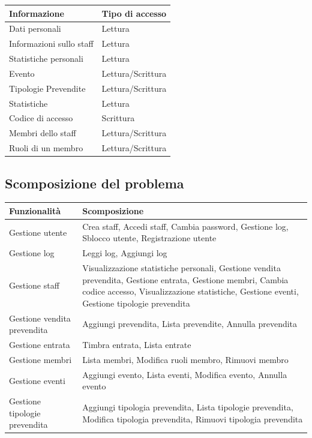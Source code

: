 \documentclass[a4paper]{article}
\begin{document}
\begin{center}
    \begin{tabularx}{1\textwidth}{|X|X|}
    \hline
    \textbf{Informazione} & \textbf{Tipo di accesso} \\
    \hline
    \hline
    Dati personali & Lettura\\
    \hline
    Informazioni sullo staff & Lettura\\
    \hline
    Statistiche personali & Lettura\\
    \hline
    Evento & Lettura/Scrittura\\
    \hline
    Tipologie Prevendite & Lettura/Scrittura\\
    \hline
    Statistiche & Lettura\\
    \hline
    Codice di accesso & Scrittura\\
    \hline
    Membri dello staff & Lettura/Scrittura\\
    \hline
    Ruoli di un membro & Lettura/Scrittura\\
    \hline
    \end{tabularx}
\end{center}

\newpage

\subsection{Scomposizione del problema}

\begin{center}
    \begin{tabularx}{1\textwidth}{|X|X|}
    \hline
    \textbf{Funzionalità} & \textbf{Scomposizione} \\
    \hline
    \hline
    Gestione utente & Crea staff, Accedi staff, Cambia password, Gestione log, Sblocco utente, Registrazione utente\\
    \hline
    Gestione log & Leggi log, Aggiungi log\\
    \hline
    Gestione staff & Visualizzazione statistiche personali, Gestione vendita prevendita, Gestione entrata, Gestione membri, Cambia codice accesso, Visualizzazione statistiche, Gestione eventi, Gestione tipologie prevendita\\
    \hline
    Gestione vendita prevendita & Aggiungi prevendita, Lista prevendite, Annulla prevendita\\
    \hline
    Gestione entrata & Timbra entrata, Lista entrate\\
    \hline
    Gestione membri & Lista membri, Modifica ruoli membro, Rimuovi membro\\
    \hline
    Gestione eventi & Aggiungi evento, Lista eventi, Modifica evento, Annulla evento\\
    \hline
    Gestione tipologie prevendita & Aggiungi tipologia prevendita, Lista tipologie prevendita, Modifica tipologia prevendita, Rimuovi tipologia prevendita\\
    \hline
    \end{tabularx}
\end{center}
\end{document}
